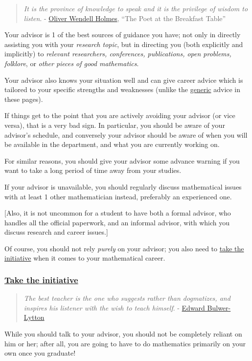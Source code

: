 \documentclass{article}
\begin{document}
\begin{quotation}
	\textit{It is the province of knowledge to speak and it is the privilege of wisdom to listen}. - \href{https://en.wikipedia.org/wiki/Oliver_Wendell_Holmes_Sr.}{Oliver Wendell Holmes}, ``The Poet at the Breakfast Table''
\end{quotation}
Your advisor is 1 of the best sources of guidance you have; not only in directly assisting you with your \textit{research topic}, but in directing you (both explicitly and implicitly) to \textit{relevant researchers, conferences, publications, open problems, folklore}, or \textit{other pieces of good mathematics}.

Your advisor also knows your situation well and can give career advice which is tailored to your specific strengths and weaknesses (unlike the \href{https://terrytao.wordpress.com/career-advice/}{generic} advice in these pages).

%
If things get to the point that you are actively avoiding your advisor (or vice versa), that is a very bad sign. In particular, you should be aware of your advisor's schedule, and conversely your advisor should be aware of when you will be available in the department, and what you are currently working on.

%
For similar reasons, you should give your advisor some advance warning if you want to take a long period of time away from your studies.

%
If your advisor is unavailable, you should regularly discuss mathematical issues with at least 1 other mathematician instead, preferably an experienced one.

[Also, it is not uncommon for a student to have both a formal advisor, who handles all the official paperwork, and an informal advisor, with which you discuss research and career issues.]

%
Of course, you should not rely \textit{purely} on your advisor; you also need to \href{https://terrytao.wordpress.com/career-advice/take-the-initiative/}{take the initiative} when it comes to your mathematical career.

\subsubsection{\href{https://terrytao.wordpress.com/career-advice/take-the-initiative/}{Take the initiative}}

\begin{quotation}
	\textit{The best teacher is the one who suggests rather than dogmatizes, and inspires his listener with the wish to teach himself}. - \href{https://en.wikipedia.org/wiki/Edward_Bulwer-Lytton}{Edward Bulwer-Lytton}
\end{quotation}
While you should talk to your advisor, you should not be completely reliant on him or her; after all, you are going to have to do mathematics primarily on your own once you graduate!
\end{document}
